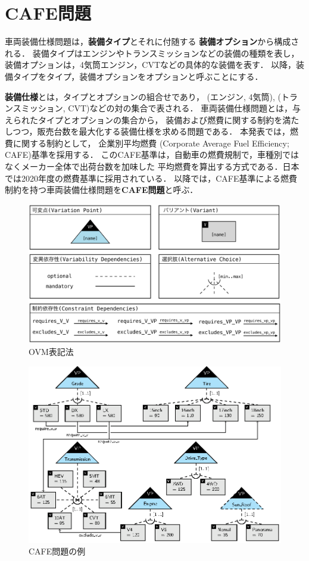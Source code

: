 \section{CAFE問題}\label{sec:background}

車両装備仕様問題は，\textbf{装備タイプ}とそれに付随する
\textbf{装備オプション}から構成される．
装備タイプはエンジンやトランスミッションなどの装備の種類を表し，
装備オプションは，4気筒エンジン，CVTなどの具体的な装備を表す．
以降，装備タイプをタイプ，装備オプションをオプションと呼ぶことにする．


\textbf{装備仕様}とは，タイプとオプションの組合せであり，
(エンジン, 4気筒), (トランスミッション, CVT)などの対の集合で表される．
車両装備仕様問題とは，与えられたタイプとオプションの集合から，
装備および燃費に関する制約を満たしつつ，販売台数を最大化する装備仕様を求める問題である．
本発表では，燃費に関する制約として，
企業別平均燃費 (Corporate Average Fuel Efficiency; CAFE)基準を採用する．
このCAFE基準は，自動車の燃費規制で，車種別ではなくメーカー全体で出荷台数を加味した
平均燃費を算出する方式である．日本では2020年度の燃費基準に採用されている．
以降では，CAFE基準による燃費制約を持つ車両装備仕様問題を\textbf{CAFE問題}と呼ぶ．

\begin{figure}[tb]
 \centerline {\includegraphics[width=\linewidth]{images/notation.eps}}
 \caption{OVM表記法\cite{Pohl05:sple}}
 \label{fig:ovm_notation}
\end{figure}

\begin{figure}[tb]
 \centerline {\includegraphics[width=\linewidth]{images/ovm_example.eps}}
 \caption{CAFE問題の例}
 \label{fig:ovm_example}
\end{figure}

